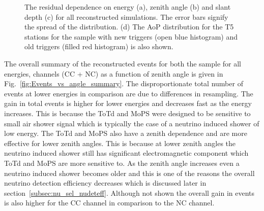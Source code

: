 \begin{figure}[h!]
  \hfill
  \caption{The residual dependence on energy (a), zenith angle (b) and slant depth (c) for all reconstructed simulations. The error bars signify the spread of the distribution. (d) The AoP distribution for the T5 stations for the sample with new triggers (open blue histogram) and old triggers (filled red histogram) is also shown.}
  \label{fig:Res_comp}
\end{figure}
\FloatBarrier
The overall summary of the reconstructed events for both the sample for all energies, channels (CC + NC) as a function of zenith angle is given in Fig.~\ref{fig:Events_vs_angle_summary}. The disproportionate total number of events at lower energies in comparison are due to differences in resampling. The gain in total events is higher for lower energies and decreases fast as the energy increases. This is because the ToTd and MoPS were designed to be sensitive to small air shower signal which is typically the case of a neutrino induced shower of low energy. The ToTd and MoPS also have a zenith dependence and are more effective for lower zenith angles. This is because at lower zenith angles the neutrino induced shower still has significant electromagnetic component which ToTd and MoPS are more sensitive to. As the zenith angle increases even a neutrino induced shower becomes older and this is one of the reasons the overall neutrino detection efficiency decreases which is discussed later in section~\ref{subsec:nu_sel_nudeteff}. Although not shown the overall gain in events is also higher for the CC channel in comparison to the NC channel. 

